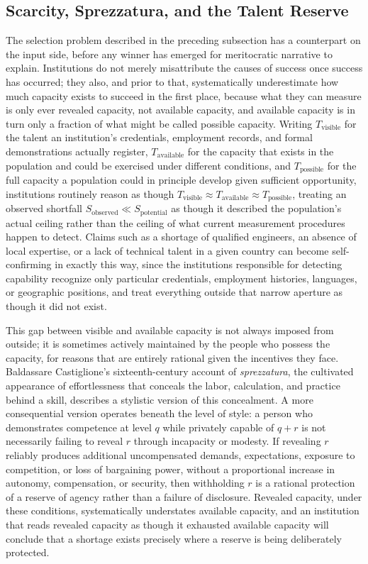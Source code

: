 \documentclass[11pt]{article}
\begin{document}
\subsection{Scarcity, Sprezzatura, and the Talent Reserve}

The selection problem described in the preceding subsection has a counterpart on the input side, before any winner has emerged for meritocratic narrative to explain. Institutions do not merely misattribute the causes of success once success has occurred; they also, and prior to that, systematically underestimate how much capacity exists to succeed in the first place, because what they can measure is only ever revealed capacity, not available capacity, and available capacity is in turn only a fraction of what might be called possible capacity. Writing $T_{\text{visible}}$ for the talent an institution's credentials, employment records, and formal demonstrations actually register, $T_{\text{available}}$ for the capacity that exists in the population and could be exercised under different conditions, and $T_{\text{possible}}$ for the full capacity a population could in principle develop given sufficient opportunity, institutions routinely reason as though $T_{\text{visible}} \approx T_{\text{available}} \approx T_{\text{possible}}$, treating an observed shortfall $S_{\text{observed}} \ll S_{\text{potential}}$ as though it described the population's actual ceiling rather than the ceiling of what current measurement procedures happen to detect. Claims such as a shortage of qualified engineers, an absence of local expertise, or a lack of technical talent in a given country can become self-confirming in exactly this way, since the institutions responsible for detecting capability recognize only particular credentials, employment histories, languages, or geographic positions, and treat everything outside that narrow aperture as though it did not exist.

This gap between visible and available capacity is not always imposed from outside; it is sometimes actively maintained by the people who possess the capacity, for reasons that are entirely rational given the incentives they face. Baldassare Castiglione's sixteenth-century account of \textit{sprezzatura}, the cultivated appearance of effortlessness that conceals the labor, calculation, and practice behind a skill, describes a stylistic version of this concealment. A more consequential version operates beneath the level of style: a person who demonstrates competence at level $q$ while privately capable of $q + r$ is not necessarily failing to reveal $r$ through incapacity or modesty. If revealing $r$ reliably produces additional uncompensated demands, expectations, exposure to competition, or loss of bargaining power, without a proportional increase in autonomy, compensation, or security, then withholding $r$ is a rational protection of a reserve of agency rather than a failure of disclosure. Revealed capacity, under these conditions, systematically understates available capacity, and an institution that reads revealed capacity as though it exhausted available capacity will conclude that a shortage exists precisely where a reserve is being deliberately protected.
\end{document}
